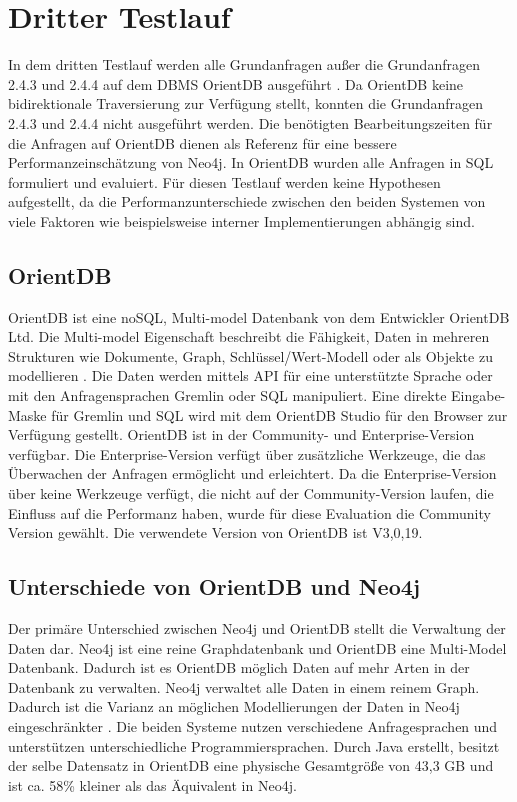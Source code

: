 \section{Dritter Testlauf}
In dem dritten Testlauf werden alle Grundanfragen außer die Grundanfragen 2.4.3 und 2.4.4 auf dem DBMS OrientDB ausgeführt \parencite{OrientDB}. Da OrientDB keine bidirektionale Traversierung zur Verfügung stellt, konnten die Grundanfragen 2.4.3 und 2.4.4 nicht ausgeführt werden. Die benötigten Bearbeitungszeiten für die Anfragen auf OrientDB dienen als Referenz für eine bessere Performanzeinschätzung von Neo4j. In OrientDB wurden alle Anfragen in SQL formuliert und evaluiert. Für diesen Testlauf werden keine Hypothesen aufgestellt, da die Performanzunterschiede zwischen den beiden Systemen von viele Faktoren wie beispielsweise interner Implementierungen abhängig sind. 
\subsection{OrientDB}
OrientDB ist eine noSQL,  Multi-model Datenbank von dem Entwickler OrientDB Ltd. Die Multi-model Eigenschaft beschreibt die Fähigkeit, Daten in mehreren Strukturen wie Dokumente, Graph, Schlüssel/Wert-Modell oder als Objekte zu modellieren \parencite{OrientDB}. Die Daten werden mittels API für eine unterstützte Sprache oder mit den Anfragensprachen Gremlin oder SQL manipuliert. Eine direkte Eingabe-Maske für Gremlin und SQL wird mit dem OrientDB Studio für den Browser zur Verfügung gestellt. OrientDB ist in der Community- und Enterprise-Version verfügbar. Die Enterprise-Version verfügt über zusätzliche Werkzeuge, die das Überwachen der Anfragen ermöglicht und erleichtert. Da die Enterprise-Version über keine Werkzeuge verfügt, die nicht auf der Community-Version laufen, die Einfluss auf die  Performanz haben, wurde für diese Evaluation die Community Version gewählt. Die verwendete Version von OrientDB ist V3,0,19. 
\subsection{Unterschiede von OrientDB und Neo4j}
Der primäre Unterschied zwischen Neo4j und OrientDB stellt die Verwaltung der Daten dar. Neo4j ist eine reine Graphdatenbank und OrientDB eine Multi-Model Datenbank. Dadurch ist es OrientDB möglich Daten auf mehr Arten in der Datenbank zu verwalten. Neo4j verwaltet alle Daten in einem reinem Graph. Dadurch ist die Varianz an möglichen Modellierungen der Daten in Neo4j eingeschränkter \parencite{fernandes2018graph}. Die beiden Systeme nutzen verschiedene Anfragesprachen und unterstützen unterschiedliche Programmiersprachen. Durch Java erstellt, besitzt der selbe Datensatz in OrientDB eine physische Gesamtgröße von 43,3 GB und ist ca. 58\% kleiner als das Äquivalent in Neo4j.